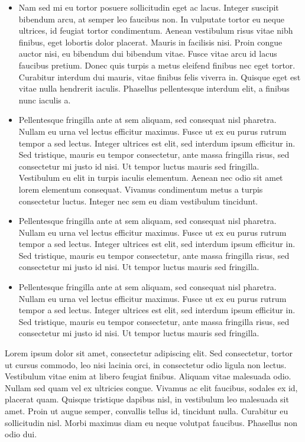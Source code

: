 \begin{itemize}
    \item Nam sed mi eu tortor posuere sollicitudin eget ac lacus. Integer suscipit bibendum arcu, at semper leo faucibus non. In vulputate tortor eu neque ultrices, id feugiat tortor condimentum. Aenean vestibulum risus vitae nibh finibus, eget lobortis dolor placerat. Mauris in facilisis nisi. Proin congue auctor nisi, eu bibendum dui bibendum vitae. Fusce vitae arcu id lacus faucibus pretium. Donec quis turpis a metus eleifend finibus nec eget tortor. Curabitur interdum dui mauris, vitae finibus felis viverra in. Quisque eget est vitae nulla hendrerit iaculis. Phasellus pellentesque interdum elit, a finibus nunc iaculis a.
    \item Pellentesque fringilla ante at sem aliquam, sed consequat nisl pharetra. Nullam eu urna vel lectus efficitur maximus. Fusce ut ex eu purus rutrum tempor a sed lectus. Integer ultrices est elit, sed interdum ipsum efficitur in. Sed tristique, mauris eu tempor consectetur, ante massa fringilla risus, sed consectetur mi justo id nisi. Ut tempor luctus mauris sed fringilla. Vestibulum eu elit in turpis iaculis elementum. Aenean nec odio sit amet lorem elementum consequat. Vivamus condimentum metus a turpis consectetur luctus. Integer nec sem eu diam vestibulum tincidunt.
    \item Pellentesque fringilla ante at sem aliquam, sed consequat nisl pharetra. Nullam eu urna vel lectus efficitur maximus. Fusce ut ex eu purus rutrum tempor a sed lectus. Integer ultrices est elit, sed interdum ipsum efficitur in. Sed tristique, mauris eu tempor consectetur, ante massa fringilla risus, sed consectetur mi justo id nisi. Ut tempor luctus mauris sed fringilla.
    \item Pellentesque fringilla ante at sem aliquam, sed consequat nisl pharetra. Nullam eu urna vel lectus efficitur maximus. Fusce ut ex eu purus rutrum tempor a sed lectus. Integer ultrices est elit, sed interdum ipsum efficitur in. Sed tristique, mauris eu tempor consectetur, ante massa fringilla risus, sed consectetur mi justo id nisi. Ut tempor luctus mauris sed fringilla. 
\end{itemize}

Lorem ipsum dolor sit amet, consectetur adipiscing elit. Sed consectetur, tortor ut cursus commodo, leo nisi lacinia orci, in consectetur odio ligula non lectus. Vestibulum vitae enim at libero feugiat finibus. Aliquam vitae malesuada odio. Nullam sed quam vel ex ultricies congue. Vivamus ac elit faucibus, sodales ex id, placerat quam. Quisque tristique dapibus nisl, in vestibulum leo malesuada sit amet. Proin ut augue semper, convallis tellus id, tincidunt nulla. Curabitur eu sollicitudin nisl. Morbi maximus diam eu neque volutpat faucibus. Phasellus non odio dui.


